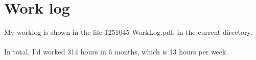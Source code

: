 \chapter{Work log}
My worklog is shown in the file 1251045-WorkLog.pdf, in the current directory.
\\
\\
In total, I'd worked 314 hours in 6 months, which is 13 hours per week.